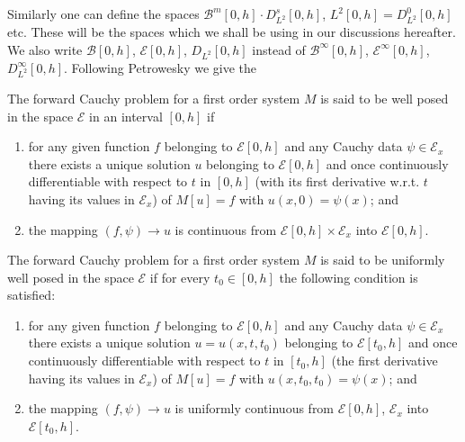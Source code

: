 Similarly one can define the spaces $\mathscr{B}^m [ 0,  h] \cdot D^s
_{L^2} [0,  h]$,  $L^2 [0, h] = D^0_{L^2} [0,  h]$ etc. These will be
the spaces which we shall be using in our discussions hereafter. We
also write $ \mathscr{B} [ 0,  h]$, $\mathscr{E} [ 0,  h]$, $D _{L^2}
[0,  h]$ instead of $ \mathscr{B}^\infty [ 0,  h]$,
$\mathscr{E}^\infty [ 0,  h]$, $D^\infty _{L^2} [0,  h]$. Following
Petrowesky \cite{key2} we give the  

\begin{defi*}
The forward Cauchy problem for a first order system $M$ is said to be
well posed in the space $\mathscr{E}$ in an interval $ [0,  h]$  if  
\begin{enumerate}[(1)]
\item for any given function $ f$ belonging to $ \mathscr{E} [0,  h]$
  and any Cauchy data $ \psi \in \mathscr{E}_x$ there exists a unique
  solution $u$ belonging to $ \mathscr{E} [0,  h]$ and once\pageoriginale
  continuously differentiable with respect to $t$ in $[0, h]$ (with
  its first derivative w.r.t. $t$ having its values in $
  \mathscr{E}_x$) of $M[u]=f$ with $u(x, 0)=\psi (x)$;  and  

\item the mapping $ (f,  \psi ) \to u $ is continuous from $
  \mathscr{E} [0,  h] \times  \mathscr{E}_x$ into $\mathscr{E} [0 ,
    h]$.  
\end{enumerate}
\end{defi*}

\begin{defi*}
The forward Cauchy problem for a first order system $ M$  is said to
be uniformly well posed in the space $\mathscr{E}$ if for every $t_0
\in [0,  h]$ the following condition is satisfied:  
\begin{enumerate}[(1)]
\item for any given function $f$ belonging to $\mathscr{E} [0, h]$
  and any Cauchy data $ \psi \in \mathscr{E}_x$ there exists a unique
  solution $u = u (x, t, t_0)$ belonging to $\mathscr{E} [t_0,  h]$
  and once continuously differentiable with respect to $t$ in $[t_0,
    h] $ (the first derivative having its values in $ \mathscr{E}_x $)
  of $M[u]=f$ with $u(x, t_0,  t_0) = \psi (x)$; and  

\item the mapping $ (f,  \psi) \to u$ is uniformly continuous from
  $\mathscr{E} [0, h]$, $\mathscr{E}_x $ into $ \mathscr{E} [t_0,
  h]$.  
\end{enumerate}
\end{defi*}

